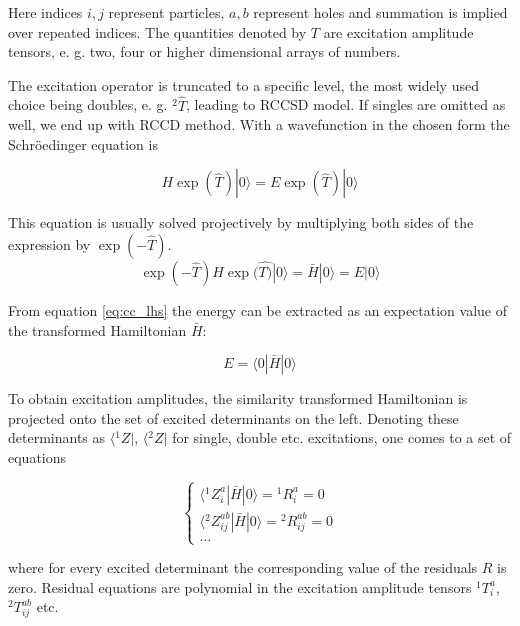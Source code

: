 Here indices $i, j$ represent particles, $a, b$ represent holes and summation 
is implied over repeated indices. The quantities denoted by $T$ are 
excitation amplitude tensors, e. g. two, four or higher dimensional arrays of 
numbers.

The excitation operator is truncated to a specific level, the most widely used 
choice being doubles, e. g. ${}^{2}\hat{T}$, leading to RCCSD model. If singles 
are omitted as well, we end up with RCCD method. With a wavefunction in the 
chosen form the Schr{\"o}edinger equation is

\begin{equation}
 H \exp(\hat{T}) |0 \rangle = E \exp(\hat{T}) |0 \rangle
\end{equation}

This equation is usually solved projectively by multiplying both sides of the 
expression by $\exp(-\hat{T})$. 
\begin{equation}
 \exp(-\hat{T}) H \exp(\hat{T)} | 0 \rangle = \bar{H} | 0 \rangle = E | 0 
\rangle
\label{eq:cc_lhs}
\end{equation}

From equation \ref{eq:cc_lhs} the energy can be extracted as an expectation 
value of the transformed Hamiltonian $\bar{H}$:

\begin{equation}
 E = \langle 0 | \bar{H} | 0 \rangle
\end{equation}

To obtain excitation amplitudes, the similarity transformed Hamiltonian 
is projected onto the set of excited determinants on the left.
Denoting these determinants as $\langle {}^{1}Z |$, $\langle {}^{2}Z|$
for single, double etc. excitations, one comes to a set of equations

\begin{equation}
\begin{cases}
 \langle {}^{1} Z_{i}^{a} | \bar{H} | 0 \rangle = {}^{1}R_{i}^{a} = 0 \\
 \langle {}^{2} Z_{ij}^{ab} | \bar{H} | 0 \rangle = {}^{2}R_{ij}^{ab} = 0 \\
 \ldots
\end{cases}
\label{eq:cc_residuals}
\end{equation}

where for every excited determinant the corresponding value of the residuals 
$R$ is zero. Residual equations are polynomial in the excitation amplitude 
tensors ${}^{1}T_{i}^{a}$, ${}^{2}T_{ij}^{ab}$ etc.

